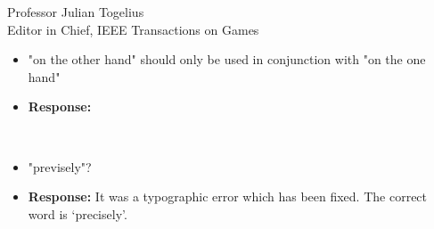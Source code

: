 \documentclass[10pt]{letter} %
\begin{document}
\begin{letter}{Professor Julian Togelius \\ Editor in Chief, IEEE Transactions on Games}
\begin{enumerate}
\begin{itemize}
\begin{itemize}
				\item 	"on the other hand" should only be used in conjunction with "on the one hand"
				\item {\bf Response:} 
                                  
				\\
				\item 	"previsely"?
				\item {\bf Response:} It was a typographic error which has been fixed. The correct word is `precisely'.
			
			\end{itemize}
\end{itemize}	

\end{enumerate}
 






\end{letter}
\end{document}
